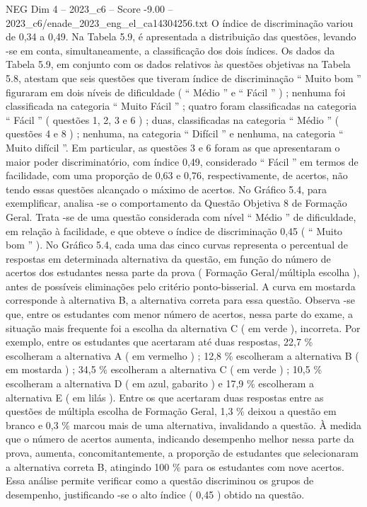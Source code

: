 \begin{textsample}{NEG Dim 4 – 2023\_c6 – Score -9.00 – 2023\_c6/enade\_2023\_eng\_el\_ca14304256.txt}
O índice de discriminação variou de 0,34 a 0,49.
Na Tabela 5.9, é apresentada a distribuição das questões, levando -se em conta, simultaneamente, a classificação dos dois índices.
Os dados da Tabela 5.9, em conjunto com os dados relativos às questões objetivas na Tabela 5.8, atestam que seis questões que tiveram índice de discriminação “ Muito bom ” figuraram em dois níveis de dificuldade ( “ Médio ” e “ Fácil ” ) ; nenhuma foi classificada na categoria “ Muito Fácil ” ; quatro foram classificadas na categoria “ Fácil ” ( questões 1, 2, 3 e 6 ) ; duas, classificadas na categoria “ Médio ” ( questões 4 e 8 ) ; nenhuma, na categoria “ Difícil ” e nenhuma, na categoria “ Muito difícil ”.
Em particular, as questões 3 e 6 foram as que apresentaram o maior poder discriminatório, com índice 0,49, considerado “ Fácil ” em termos de facilidade, com uma proporção de 0,63 e 0,76, respectivamente, de acertos, não tendo essas questões alcançado o máximo de acertos.
No Gráfico 5.4, para exemplificar, analisa -se o comportamento da Questão Objetiva 8 de Formação Geral.
Trata -se de uma questão considerada com nível “ Médio ” de dificuldade, em relação à facilidade, e que obteve o índice de discriminação 0,45 ( “ Muito bom ” ).
No Gráfico 5.4, cada uma das cinco curvas representa o percentual de respostas em determinada alternativa da questão, em função do número de acertos dos estudantes nessa parte da prova ( Formação Geral/múltipla escolha ), antes de possíveis eliminações pelo critério ponto-bisserial.
A curva em mostarda corresponde à alternativa B, a alternativa correta para essa questão.
Observa -se que, entre os estudantes com menor número de acertos, nessa parte do exame, a situação mais frequente foi a escolha da alternativa C ( em verde ), incorreta.
Por exemplo, entre os estudantes que acertaram até duas respostas, 22,7 \% escolheram a alternativa A ( em vermelho ) ; 12,8 \% escolheram a alternativa B ( em mostarda ) ; 34,5 \% escolheram a alternativa C ( em verde ) ; 10,5 \% escolheram a alternativa D ( em azul, gabarito ) e 17,9 \% escolheram a alternativa E ( em lilás ).
Entre os que acertaram duas respostas entre as questões de múltipla escolha de Formação Geral, 1,3 \% deixou a questão em branco e 0,3 \% marcou mais de uma alternativa, invalidando a questão.
À medida que o número de acertos aumenta, indicando desempenho melhor nessa parte da prova, aumenta, concomitantemente, a proporção de estudantes que selecionaram a alternativa correta B, atingindo 100 \% para os estudantes com nove acertos.
Essa análise permite verificar como a questão discriminou os grupos de desempenho, justificando -se o alto índice ( 0,45 ) obtido na questão.

\end{textsample}
